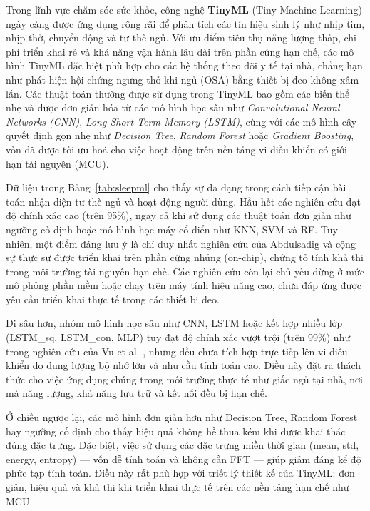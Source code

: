 Trong lĩnh vực chăm sóc sức khỏe, công nghệ \textbf{TinyML} (Tiny Machine
Learning) ngày càng được ứng dụng rộng rãi để phân tích các tín hiệu sinh lý
như nhịp tim, nhịp thở, chuyển động và tư thế ngủ. Với ưu điểm tiêu thụ năng
lượng thấp, chi phí triển khai rẻ và khả năng vận hành lâu dài trên phần cứng
hạn chế, các mô hình TinyML đặc biệt phù hợp cho các hệ thống theo dõi y tế tại
nhà, chẳng hạn như phát hiện hội chứng ngưng thở khi ngủ (OSA) bằng thiết bị
đeo không xâm lấn. Các thuật toán thường được sử dụng trong TinyML bao gồm các
biến thể nhẹ và được đơn giản hóa từ các mô hình học sâu như
\textit{Convolutional Neural Networks (CNN)}, \textit{Long Short-Term Memory
  (LSTM)}, cùng với các mô hình cây quyết định gọn nhẹ như \textit{Decision
  Tree}, \textit{Random Forest} hoặc \textit{Gradient Boosting}, vốn đã được tối
ưu hoá cho việc hoạt động trên nền tảng vi điều khiển có giới hạn tài nguyên
(MCU).

Dữ liệu trong Bảng~\ref{tab:sleepml} cho thấy sự đa dạng trong cách tiếp cận
bài toán nhận diện tư thế ngủ và hoạt động người dùng. Hầu hết các nghiên cứu
đạt độ chính xác cao (trên 95\%), ngay cả khi sử dụng các thuật toán đơn giản
như ngưỡng cố định hoặc mô hình học máy cổ điển như KNN, SVM và RF. Tuy nhiên,
một điểm đáng lưu ý là chỉ duy nhất nghiên cứu của Abdulsadig và cộng sự
\cite{abdulsadig2023} thực sự được triển khai trên phần cứng nhúng (on-chip),
chứng tỏ tính khả thi trong môi trường tài nguyên hạn chế. Các nghiên cứu còn
lại chủ yếu dừng ở mức mô phỏng phần mềm hoặc chạy trên máy tính hiệu năng cao,
chưa đáp ứng được yêu cầu triển khai thực tế trong các thiết bị đeo.

Đi sâu hơn, nhóm mô hình học sâu như CNN, LSTM hoặc kết hợp nhiều lớp
(LSTM\_sq, LSTM\_con, MLP) tuy đạt độ chính xác vượt trội (trên 99\%) như trong nghiên cứu của Vu et al. \cite{vu2023}, nhưng đều chưa tích hợp trực tiếp lên vi điều khiển do dung lượng bộ nhớ lớn và nhu cầu tính toán cao. Điều này đặt ra thách thức cho việc ứng dụng chúng trong môi trường thực tế như giấc ngủ tại nhà, nơi mà năng lượng, khả năng lưu trữ và kết nối đều bị hạn chế.

Ở chiều ngược lại, các mô hình đơn giản hơn như Decision Tree,
Random Forest hay ngưỡng cố định cho thấy hiệu quả không hề thua
kém khi được khai thác đúng đặc trưng.
Đặc biệt, việc sử dụng các đặc trưng miền thời gian
(mean, std, energy, entropy) — vốn dễ tính toán và
không cần FFT — giúp giảm đáng kể độ phức tạp tính toán.
Điều này rất phù hợp với triết lý thiết kế của TinyML:
đơn giản, hiệu quả và khả thi khi triển khai thực
tế trên các nền tảng hạn chế như MCU.


